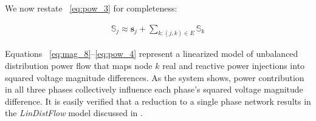 We now restate ~\eqref{eq:pow_3} for completeness:

\begin{align}
	\mathbb{S}_{j} \approx \mathbf{s}_{j} + \sum_{k:(j,k) \in E} \mathbb{S}_{k} \label{eq:pow_4}
\end{align}

Equations ~\eqref{eq:mag_8}--\eqref{eq:pow_4} represent a linearized model of unbalanced distribution power flow that maps node $k$ real and reactive power injections into squared voltage magnitude differences. As the system shows, power contribution in all three phases collectively influence each phase's squared voltage magnitude difference.  It is easily verified that a reduction to a single phase network results in the \emph{LinDistFlow} model discussed in \cite{baran1989optimal}.









